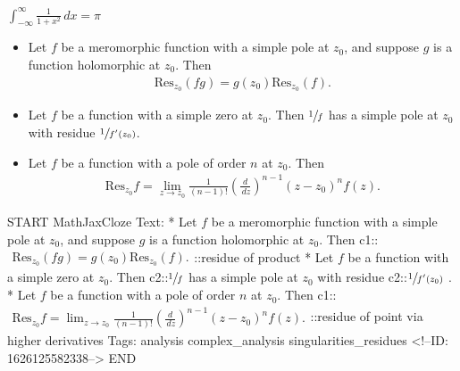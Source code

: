 \documentclass{memoir}
\begin{document}
\begin{exmp}
	\(\int_{-\infty}^{\infty} \frac{1}{1+x^2}\,d x = \pi \)
\end{exmp}

\begin{exmp}
	
\end{exmp}

\begin{lemma}
	\begin{itemize}
		\item Let \(f\) be a meromorphic function with a simple pole at \(z_0\), and suppose \(g\) is a function holomorphic at \(z_0\). Then
			\begin{align*}
				\textrm{Res}_{z_0}(fg) = g(z_0) \textrm{Res}_{z_0}(f).
			\end{align*}
		\item Let \(f\) be a function with a simple zero at \(z_0\). Then \(\sfrac{1}{f}\) has a simple pole at \(z_0\) with residue \(\sfrac{1}{f'(z_0)}\).
		\item Let \(f\) be a function with a pole of order \(n\) at \(z_0\). Then
			\begin{align*}
				\textrm{Res}_{z_0}f = \lim_{z \to z_0} \frac{1}{(n-1)!} \left( \frac{d}{\,d z} \right)^{n-1}(z-z_0)^{n}f(z).
			\end{align*}
	\end{itemize}
\end{lemma}

\begin{anki}
START
MathJaxCloze
Text: 
* Let \(f\) be a meromorphic function with a simple pole at \(z_0\), and suppose \(g\) is a function holomorphic at \(z_0\). Then
 {{c1::\(\begin{align*}
         	\textrm{Res}_{z_0}(fg) = g(z_0) \textrm{Res}_{z_0}(f).
         \end{align*}\)::residue of product}} 
* Let \(f\) be a function with a simple zero at \(z_0\). Then {{c2::\(\sfrac{1}{f}\)}} has a simple pole at \(z_0\) with residue {{c2::\(\sfrac{1}{f'(z_0)}\)}} .
* Let \(f\) be a function with a pole of order \(n\) at \(z_0\). Then
{{c1::\(\begin{align*}
        	\textrm{Res}_{z_0}f = \lim_{z \to z_0} \frac{1}{(n-1)!} \left( \frac{d}{\,d z} \right)^{n-1}(z-z_0)^{n}f(z).
        \end{align*}\)::residue of point via higher derivatives}} 
Tags: analysis complex_analysis singularities_residues
<!--ID: 1626125582338-->
END
\end{anki}
\end{document}
